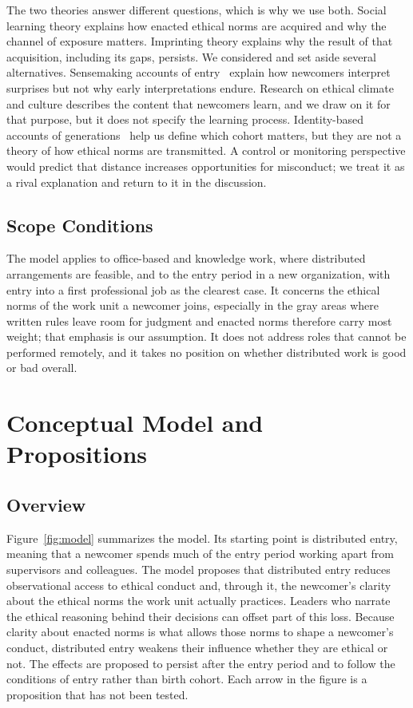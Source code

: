 \documentclass[12pt,a4paper]{article}
\theoremstyle{definition}
\begin{document}
The two theories answer different questions, which is why we use both. Social learning theory explains how enacted ethical norms are acquired and why the channel of exposure matters. Imprinting theory explains why the result of that acquisition, including its gaps, persists. We considered and set aside several alternatives. Sensemaking accounts of entry~\citep{louis1980surprise} explain how newcomers interpret surprises but not why early interpretations endure. Research on ethical climate and culture describes the content that newcomers learn, and we draw on it for that purpose, but it does not specify the learning process. Identity-based accounts of generations~\citep{joshi2010unpacking} help us define which cohort matters, but they are not a theory of how ethical norms are transmitted. A control or monitoring perspective would predict that distance increases opportunities for misconduct; we treat it as a rival explanation and return to it in the discussion.

\subsection{Scope Conditions}

The model applies to office-based and knowledge work, where distributed arrangements are feasible, and to the entry period in a new organization, with entry into a first professional job as the clearest case. It concerns the ethical norms of the work unit a newcomer joins, especially in the gray areas where written rules leave room for judgment and enacted norms therefore carry most weight; that emphasis is our assumption. It does not address roles that cannot be performed remotely, and it takes no position on whether distributed work is good or bad overall.

\section{Conceptual Model and Propositions}
\subsection{Overview}

Figure~\ref{fig:model} summarizes the model. Its starting point is distributed entry, meaning that a newcomer spends much of the entry period working apart from supervisors and colleagues. The model proposes that distributed entry reduces observational access to ethical conduct and, through it, the newcomer's clarity about the ethical norms the work unit actually practices. Leaders who narrate the ethical reasoning behind their decisions can offset part of this loss. Because clarity about enacted norms is what allows those norms to shape a newcomer's conduct, distributed entry weakens their influence whether they are ethical or not. The effects are proposed to persist after the entry period and to follow the conditions of entry rather than birth cohort. Each arrow in the figure is a proposition that has not been tested.
\end{document}
